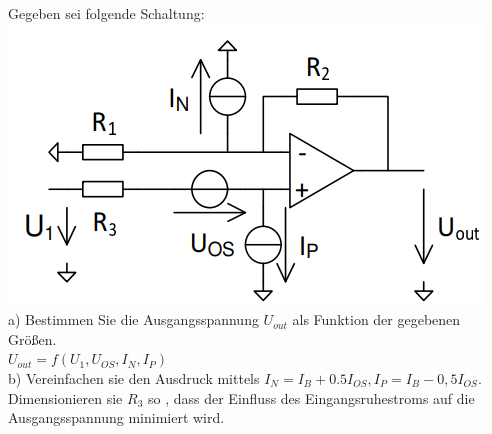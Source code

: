 \documentclass[A4]{scrreprt}
\begin{document}
  Gegeben sei folgende Schaltung:\\
  \includegraphics{Schaltung8.png}\\
  a) Bestimmen Sie die Ausgangsspannung $U_{out}$ als Funktion der gegebenen Größen.\\
  $U_{out} = f(U_1,U_{OS},I_N,I_P)$\\
  b) Vereinfachen sie den Ausdruck mittels $I_N = I_B + 0.5 I_{OS}, I_P = I_B-0,5 I_{OS}$.\\
  Dimensionieren sie $R_3$ so , dass der Einfluss des Eingangsruhestroms auf die Ausgangsspannung minimiert wird.\\\\
\end{document}
